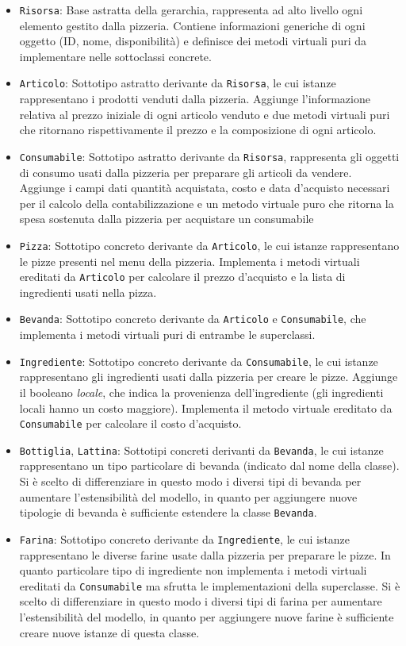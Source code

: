 \documentclass[
  10pt,
]{article}
\begin{document}
\begin{itemize}
\item
  \texttt{Risorsa}: Base astratta della gerarchia, rappresenta ad alto
  livello ogni elemento gestito dalla pizzeria. Contiene informazioni
  generiche di ogni oggetto (ID, nome, disponibilità) e definisce dei
  metodi virtuali puri da implementare nelle sottoclassi concrete.
\item
  \texttt{Articolo}: Sottotipo astratto derivante da \texttt{Risorsa},
  le cui istanze rappresentano i prodotti venduti dalla pizzeria.
  Aggiunge l'informazione relativa al prezzo iniziale di ogni articolo
  venduto e due metodi virtuali puri che ritornano rispettivamente il
  prezzo e la composizione di ogni articolo.
\item
  \texttt{Consumabile}: Sottotipo astratto derivante da
  \texttt{Risorsa}, rappresenta gli oggetti di consumo usati dalla
  pizzeria per preparare gli articoli da vendere. Aggiunge i campi dati
  quantità acquistata, costo e data d'acquisto necessari per il calcolo
  della contabilizzazione e un metodo virtuale puro che ritorna la spesa
  sostenuta dalla pizzeria per acquistare un consumabile
\item
  \texttt{Pizza}: Sottotipo concreto derivante da \texttt{Articolo}, le
  cui istanze rappresentano le pizze presenti nel menu della pizzeria.
  Implementa i metodi virtuali ereditati da \texttt{Articolo} per
  calcolare il prezzo d'acquisto e la lista di ingredienti usati nella
  pizza.
\item
  \texttt{Bevanda}: Sottotipo concreto derivante da \texttt{Articolo} e
  \texttt{Consumabile}, che implementa i metodi virtuali puri di
  entrambe le superclassi.
\item
  \texttt{Ingrediente}: Sottotipo concreto derivante da
  \texttt{Consumabile}, le cui istanze rappresentano gli ingredienti
  usati dalla pizzeria per creare le pizze. Aggiunge il booleano
  \emph{locale}, che indica la provenienza dell'ingrediente (gli
  ingredienti locali hanno un costo maggiore). Implementa il metodo
  virtuale ereditato da \texttt{Consumabile} per calcolare il costo
  d'acquisto.
\item
  \texttt{Bottiglia}, \texttt{Lattina}: Sottotipi concreti derivanti da
  \texttt{Bevanda}, le cui istanze rappresentano un tipo particolare di
  bevanda (indicato dal nome della classe). Si è scelto di differenziare
  in questo modo i diversi tipi di bevanda per aumentare l'estensibilità
  del modello, in quanto per aggiungere nuove tipologie di bevanda è
  sufficiente estendere la classe \texttt{Bevanda}.
\item
  \texttt{Farina}: Sottotipo concreto derivante da \texttt{Ingrediente},
  le cui istanze rappresentano le diverse farine usate dalla pizzeria
  per preparare le pizze. In quanto particolare tipo di ingrediente non
  implementa i metodi virtuali ereditati da \texttt{Consumabile} ma
  sfrutta le implementazioni della superclasse. Si è scelto di
  differenziare in questo modo i diversi tipi di farina per aumentare
  l'estensibilità del modello, in quanto per aggiungere nuove farine è
  sufficiente creare nuove istanze di questa classe.
\end{itemize}
\end{document}

